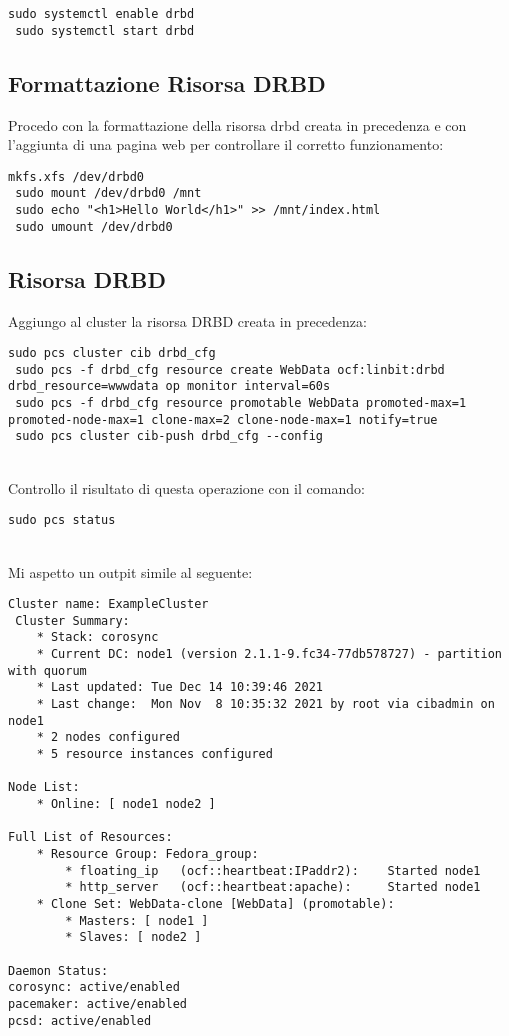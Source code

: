 \begin{lstlisting}[style=cmd]
 sudo systemctl enable drbd
 sudo systemctl start drbd
\end{lstlisting}

\subsection{Formattazione Risorsa DRBD}

Procedo con la formattazione della risorsa drbd creata in precedenza e con l'aggiunta di una pagina web per controllare il corretto funzionamento:

\begin{lstlisting}[style=cmd]
 mkfs.xfs /dev/drbd0
 sudo mount /dev/drbd0 /mnt
 sudo echo "<h1>Hello World</h1>" >> /mnt/index.html
 sudo umount /dev/drbd0
\end{lstlisting}

\subsection{Risorsa DRBD}

Aggiungo al cluster la risorsa DRBD creata in precedenza:

\begin{lstlisting}[style=cmd]
 sudo pcs cluster cib drbd_cfg
 sudo pcs -f drbd_cfg resource create WebData ocf:linbit:drbd drbd_resource=wwwdata op monitor interval=60s
 sudo pcs -f drbd_cfg resource promotable WebData promoted-max=1 promoted-node-max=1 clone-max=2 clone-node-max=1 notify=true
 sudo pcs cluster cib-push drbd_cfg --config
\end{lstlisting}
\ \\
Controllo il risultato di questa operazione con il comando:

\begin{lstlisting}[style=cmd]
 sudo pcs status
\end{lstlisting}
\ \\
Mi aspetto un outpit simile al seguente:

\begin{lstlisting}[style=output]
 Cluster name: ExampleCluster
 Cluster Summary:
    * Stack: corosync
    * Current DC: node1 (version 2.1.1-9.fc34-77db578727) - partition with quorum
    * Last updated: Tue Dec 14 10:39:46 2021
    * Last change:  Mon Nov  8 10:35:32 2021 by root via cibadmin on node1
    * 2 nodes configured
    * 5 resource instances configured

Node List:
    * Online: [ node1 node2 ]

Full List of Resources:
    * Resource Group: Fedora_group:
        * floating_ip	(ocf::heartbeat:IPaddr2):	 Started node1
        * http_server	(ocf::heartbeat:apache):	 Started node1
    * Clone Set: WebData-clone [WebData] (promotable):
        * Masters: [ node1 ]
        * Slaves: [ node2 ]

Daemon Status:
corosync: active/enabled
pacemaker: active/enabled
pcsd: active/enabled

\end{lstlisting}

